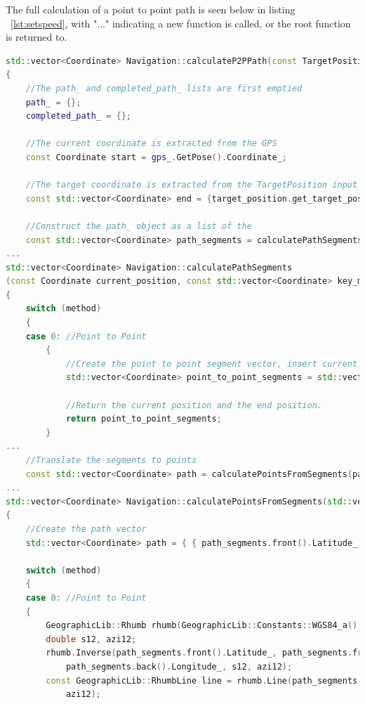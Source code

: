 The full calculation of a point to point path is seen below in listing ~\ref{lst:setspeed}, with "..." indicating a new function is called, or the root function is returned to.

\begin{lstlisting}[caption = {Function responsible for calculating a P2P path}, captionpos=b, label={lst:calculateP2PPath}, language=C++,firstnumber=1]
std::vector<Coordinate> Navigation::calculateP2PPath(const TargetPosition target_position)
{
	//The path_ and completed_path_ lists are first emptied
	path_ = {};
	completed_path_ = {};

	//The current coordinate is extracted from the GPS
	const Coordinate start = gps_.GetPose().Coordinate_;

	//The target coordinate is extracted from the TargetPosition input
	const std::vector<Coordinate> end = {target_position.get_target_postion()};

	//Construct the path_ object as a list of the 
	const std::vector<Coordinate> path_segments = calculatePathSegments(start, end, 0);
...
std::vector<Coordinate> Navigation::calculatePathSegments
(const Coordinate current_position, const std::vector<Coordinate> key_method_positions, const int method) const
{
	switch (method)
	{
	case 0: //Point to Point
		{
			//Create the point to point segment vector, insert current position and end position
			std::vector<Coordinate> point_to_point_segments = std::vector<Coordinate>{current_position, key_method_positions[0]};

			//Return the current position and the end position.
			return point_to_point_segments;
		}
...
	//Translate the segments to points
	const std::vector<Coordinate> path = calculatePointsFromSegments(path_segments, 1);
...
std::vector<Coordinate> Navigation::calculatePointsFromSegments(std::vector<Coordinate> path_segments,const int method)const
{
	//Create the path vector
	std::vector<Coordinate> path = { { path_segments.front().Latitude_, path_segments.front().Longitude_ } };

	switch (method)
	{
	case 0: //Point to Point
	{
		GeographicLib::Rhumb rhumb(GeographicLib::Constants::WGS84_a(), GeographicLib::Constants::WGS84_f());
		double s12, azi12;
		rhumb.Inverse(path_segments.front().Latitude_, path_segments.front().Longitude_, path_segments.back().Latitude_,
			path_segments.back().Longitude_, s12, azi12);
		const GeographicLib::RhumbLine line = rhumb.Line(path_segments.front().Latitude_, path_segments.front().Longitude_,
			azi12);


\end{lstlisting}
